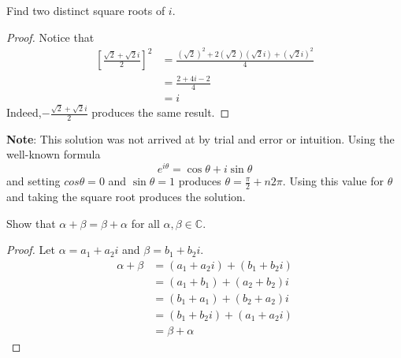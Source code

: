 \begin{exercise} \label{1.A.3}
    Find two distinct square roots of \( i \).
    
    \begin{proof}
        Notice that 
        \begin{align*}
            \left[ \frac{\sqrt{2}+\sqrt{2}i}{2} \right]^2 &= \frac{(\sqrt{2})^2+2(\sqrt{2})(\sqrt{2}i)+(\sqrt{2}i)^2}{4} \\
            &= \frac{2 + 4i - 2}{4} \\
            &= i
        \end{align*}
        Indeed,\( -\frac{\sqrt{2}+\sqrt{2}i}{2} \) produces the same result.
    \end{proof}
    
    \textbf{Note}: This solution was not arrived at by trial and error or intuition. Using the well-known formula
    \[ e^{i\theta} = \cos \theta + i \sin \theta \]
    and setting \( cos \theta =0 \) and \( \sin \theta = 1 \) produces \( \theta = \frac{\pi}{2} + n2\pi \). Using this value for \( \theta \) and taking the square root produces the solution.
\end{exercise}

\begin{exercise} \label{1.A.4}
    Show that \( \alpha + \beta = \beta + \alpha \) for all \( \alpha, \beta \in \mathbb{C} \).
    
    \begin{proof}
        Let \( \alpha = a_1+a_2i \) and \( \beta = b_1 + b_2i \).
        \begin{align*}
            \alpha + \beta &= \left( a_1+a_2i \right) + \left( b_1+b_2i \right) \\
            &= \left( a_1+b_1 \right) + \left( a_2+b_2 \right) i \\
            &= \left( b_1+a_1 \right) + \left( b_2+a_2 \right) i \\
            &= \left( b_1+b_2i \right) + \left( a_1+a_2i \right) \\
            &= \beta + \alpha
        \end{align*}
    \end{proof}
\end{exercise}

